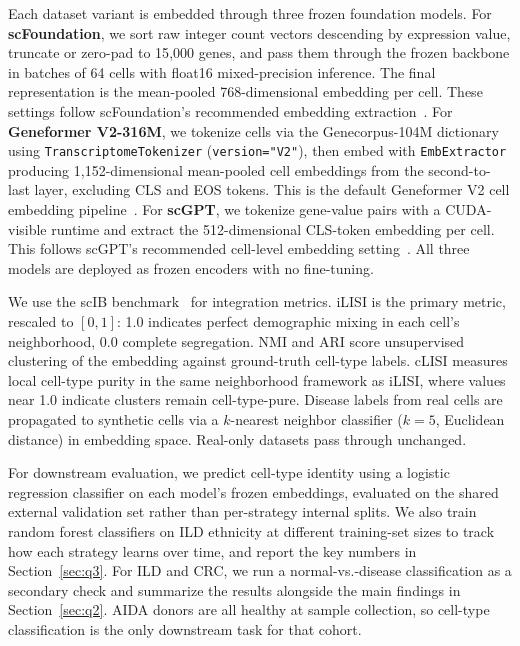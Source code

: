 \documentclass[sigconf]{acmart}
\begin{document}
Each dataset variant is embedded through three frozen foundation models. For 
\textbf{scFoundation}, we sort raw integer count vectors descending by 
expression value, truncate or zero-pad to 15{,}000 genes, and pass them 
through the frozen backbone in batches of 64 cells with float16 
mixed-precision inference. The final representation is the mean-pooled 
768-dimensional embedding per cell. These settings follow scFoundation's recommended embedding extraction~\cite{hao2024scfoundation}. For \textbf{Geneformer V2-316M}, we 
tokenize cells via the Genecorpus-104M dictionary using 
\texttt{TranscriptomeTokenizer} (\texttt{version="V2"}), then embed with \texttt{EmbExtractor} producing 1{,}152-dimensional mean-pooled cell 
embeddings from the second-to-last layer, excluding CLS and EOS tokens. This is the default Geneformer V2 cell embedding pipeline~\cite{theodoris2023geneformer}. For 
\textbf{scGPT}, we tokenize gene-value pairs with a CUDA-visible runtime and 
extract the 512-dimensional CLS-token embedding per cell. This follows scGPT's recommended cell-level embedding setting~\cite{cui2024scgpt}. All three models are 
deployed as frozen encoders with no fine-tuning.

We use the scIB benchmark~\cite{luecken2022benchmarking} for integration metrics. iLISI is the primary metric, rescaled to $[0,1]$: 1.0 indicates perfect demographic mixing in each cell's neighborhood, 0.0 complete segregation. NMI and ARI score unsupervised clustering of the embedding against ground-truth cell-type labels. cLISI measures local cell-type purity in the same neighborhood framework as iLISI, where values near 1.0 indicate clusters remain cell-type-pure. Disease labels from real cells are propagated to synthetic cells via a $k$-nearest neighbor classifier ($k = 5$, Euclidean distance) in embedding space. Real-only datasets pass through unchanged.

For downstream evaluation, we predict cell-type identity using a logistic regression classifier on each model's frozen embeddings, evaluated on the shared external validation set rather than per-strategy internal splits. We also train random forest classifiers on ILD ethnicity at different training-set sizes to track how each strategy learns over time, and report the key numbers in Section~\ref{sec:q3}. For ILD and CRC, we run a normal-vs.-disease classification as a secondary check and summarize the results alongside the main findings in Section~\ref{sec:q2}. AIDA donors are all healthy at sample collection, so cell-type classification is the only downstream task for that cohort.
\end{document}
